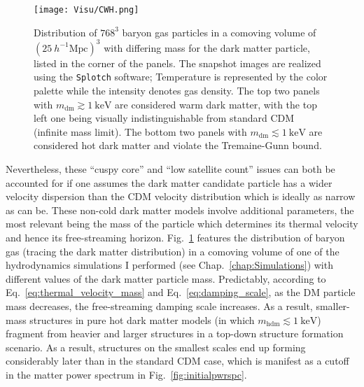\begin{figure}
\begin{center}
\texttt{[image: Visu/CWH.png]}
\caption{Distribution of $768^3$ baryon gas particles in a comoving volume of $(25~h^{-1}\mathrm{Mpc})^3$ with differing mass for the dark matter particle, listed in the corner of the panels. The snapshot images are realized using the \texttt{Splotch} software; Temperature is represented by the color palette while the intensity denotes gas density. The top two panels with $m_{\mathrm{dm}} \gtrsim 1 ~\mathrm{keV}$ are considered warm dark matter, with the top left one being visually indistinguishable from standard CDM (infinite mass limit). The bottom two panels with $m_{\mathrm{dm}} \lesssim 1 ~\mathrm{keV}$ are considered hot dark matter and violate the Tremaine-Gunn bound.}
\label{fig:visu_wdm}
\end{center}
\end{figure}

Nevertheless, these ``cuspy core'' and ``low satellite count'' issues can both be accounted for if one assumes the dark matter candidate particle has a wider velocity dispersion than the CDM velocity distribution which is ideally as narrow as can be. These non-cold dark matter models involve additional parameters, the most relevant being the mass of the particle which determines its thermal velocity and hence its free-streaming horizon. Fig.~\ref{fig:visu_wdm} features the distribution of baryon gas (tracing the dark matter distribution) in a comoving volume of one of the hydrodynamics simulations I performed (see Chap.~\ref{chap:Simulations}) with different values of the dark matter particle mass. Predictably, according to Eq.~\ref{eq:thermal_velocity_mass} and Eq.~\ref{eq:damping_scale}, as the DM particle mass decreases, the free-streaming damping scale increases. As a result, smaller-mass structures in pure hot dark matter models (in which $m_{\mathrm{hdm}} \lesssim 1 ~\mathrm{keV}$) fragment from heavier and larger structures in a top-down structure formation scenario. As a result, structures on the smallest scales end up forming considerably later than in the standard CDM case, which is manifest as a cutoff in the matter power spectrum in Fig.~\ref{fig:initialpwrspc}. \\

